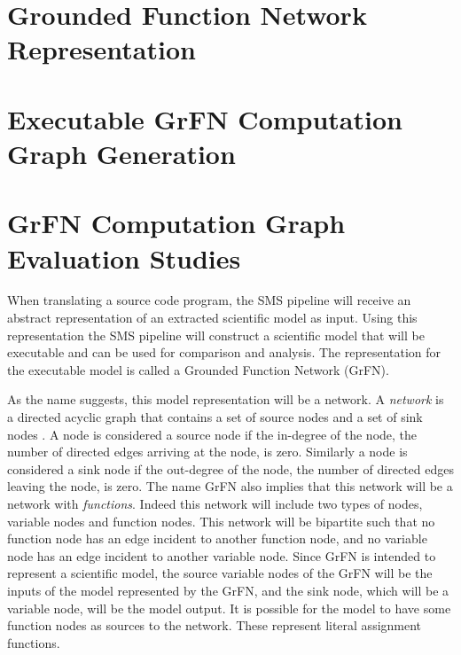 \section{Grounded Function Network Representation\label{sec:grfn_rep}}

\section{Executable GrFN Computation Graph Generation\label{sec:grfn_cg_gen}}


\section{GrFN Computation Graph Evaluation Studies\label{sec:grfn_eval}}


When translating a source code program, the SMS pipeline will receive an abstract representation of an extracted scientific model as input.
Using this representation the SMS pipeline will construct a scientific model that will be executable and can be used for comparison and analysis.
The representation for the executable model is called a Grounded Function Network (GrFN).

As the name suggests, this model representation will be a network.
A \emph{network} is a directed acyclic graph that contains a set of source nodes and a set of sink nodes \citep{bondy1976graph}.
A node is considered a source node if the in-degree of the node, the number of directed edges arriving at the node, is zero.
Similarly a node is considered a sink node if the out-degree of the node, the number of directed edges leaving the node, is zero.
The name GrFN also implies that this network will be a network with \emph{functions}.
Indeed this network will include two types of nodes, variable nodes and function nodes.
This network will be bipartite such that no function node has an edge incident to another function node, and no variable node has an edge incident to another variable node.
Since GrFN is intended to represent a scientific model, the source variable nodes of the GrFN will be the inputs of the model represented by the GrFN, and the sink node, which will be a variable node, will be the model output.
It is possible for the model to have some function nodes as sources to the network.
These represent literal assignment functions.

